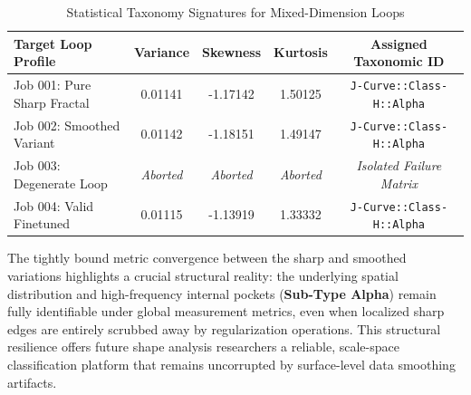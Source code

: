 \begin{table}[h!]
    \centering
    \caption{Statistical Taxonomy Signatures for Mixed-Dimension Loops}
    \label{tab:taxonomy_metrics}
    \begin{tabular}{lcccc}
        \hline
        \textbf{Target Loop Profile} & \textbf{Variance} & \textbf{Skewness} & \textbf{Kurtosis} & \textbf{Assigned Taxonomic ID} \\
        \hline
        Job 001: Pure Sharp Fractal  & 0.01141           & -1.17142          & 1.50125           & \texttt{J-Curve::Class-H::Alpha} \\
        Job 002: Smoothed Variant    & 0.01142           & -1.18151          & 1.49147           & \texttt{J-Curve::Class-H::Alpha} \\
        Job 003: Degenerate Loop     & \textit{Aborted}  & \textit{Aborted}  & \textit{Aborted}  & \textit{Isolated Failure Matrix} \\
        Job 004: Valid Finetuned     & 0.01115           & -1.13919          & 1.33332           & \texttt{J-Curve::Class-H::Alpha} \\
        \hline
    \end{tabular}
\end{table}

The tightly bound metric convergence between the sharp and smoothed variations highlights a crucial structural reality: the underlying spatial distribution and high-frequency internal pockets (\textbf{Sub-Type Alpha}) remain fully identifiable under global measurement metrics, even when localized sharp edges are entirely scrubbed away by regularization operations. This structural resilience offers future shape analysis researchers a reliable, scale-space classification platform that remains uncorrupted by surface-level data smoothing artifacts.
